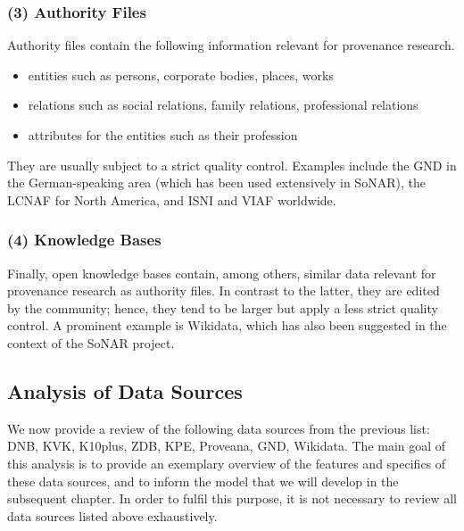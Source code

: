 \subsubsection{(3) Authority Files}

Authority files contain the following information relevant for provenance research.
%
\begin{itemize}
  \item
    entities such as persons, corporate bodies, places, works
  \item
    relations such as social relations, family relations, professional relations
  \item
    attributes for the entities such as their profession
\end{itemize}
%
They are usually subject to a strict quality control.
Examples include the \gls{GND} in the German-speaking area (which has been used extensively in \gls{SoNAR}),
the \gls{LCNAF} for North America,
and \gls{ISNI} and \gls{VIAF} worldwide.

\subsubsection{(4) Knowledge Bases}

Finally, open knowledge bases contain, among others, similar data relevant for provenance research as authority files.
In contrast to the latter, they are edited by the community; hence, they tend to be larger but apply
a less strict quality control. A prominent example is Wikidata, which has also been suggested in the context of the \gls{SoNAR} project.

\subsection{Analysis of Data Sources}

We now provide a review of the following data sources from the previous list:
\gls{DNB}, \gls{KVK}, \gls{K10plus}, \gls{ZDB}, \gls{KPE}, Proveana, \gls{GND}, Wikidata. 
The main goal of this analysis is to provide an exemplary overview of the features and specifics
of these data sources, and to inform the model that we will develop in the subsequent chapter.
In order to fulfil this purpose, it is not necessary to review all data sources listed above
exhaustively.

